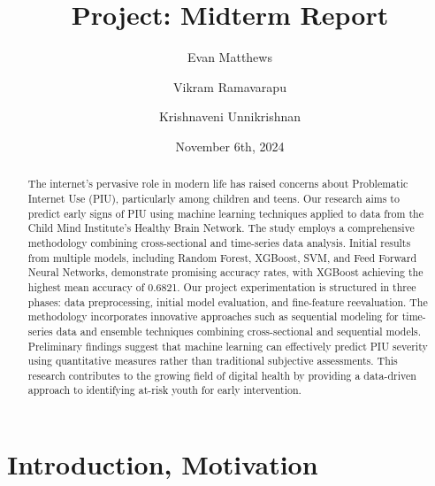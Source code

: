 \documentclass[11pt]{extarticle}
\title{Project: Midterm Report}
\author[1]{Evan Matthews}
\author[1]{Vikram Ramavarapu}
\author[1]{Krishnaveni Unnikrishnan}
\affil[1]{CS 412 Group G6}
\date{November 6th, 2024}
\begin{document}
\maketitle

\begin{abstract}
    The internet's pervasive role in modern life has raised concerns about Problematic Internet Use (PIU), particularly among children and teens. 
    Our research aims to predict early signs of PIU using machine learning techniques applied to data from the Child Mind Institute's Healthy Brain Network. 
    The study employs a comprehensive methodology combining cross-sectional and time-series data analysis. 
    Initial results from multiple models, including Random Forest, XGBoost, SVM, and Feed Forward Neural Networks, demonstrate promising accuracy rates, with XGBoost achieving the highest mean accuracy of 0.6821. 
    Our project experimentation is structured in three phases: data preprocessing, initial model evaluation, and fine-feature reevaluation. 
    The methodology incorporates innovative approaches such as sequential modeling for time-series data and ensemble techniques combining cross-sectional and sequential models. 
    Preliminary findings suggest that machine learning can effectively predict PIU severity using quantitative measures rather than traditional subjective assessments. 
    This research contributes to the growing field of digital health by providing a data-driven approach to identifying at-risk youth for early intervention.
\end{abstract}

\pagebreak


\section{Introduction, Motivation}
\end{document}
